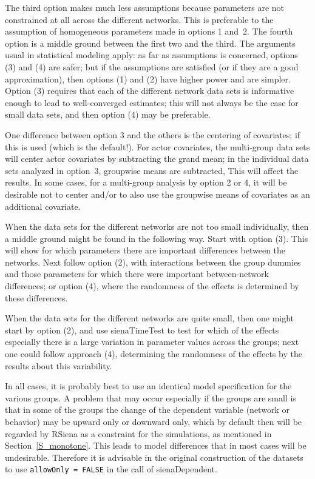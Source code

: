 \documentclass[a4paper,fleqn,11pt]{article}
\newcommand{\+}{\, + \,}
\newcommand{\sfn}[1]{\textsf{#1}}
\newcommand{\RS}{{\sf RSiena }}
\begin{document}
The third option makes much less assumptions because parameters are not
constrained at all across the different networks.
This is preferable to the assumption of homogeneous parameters
made in options 1 and~2.
The fourth option is a middle ground between the first two and the third.
The arguments usual in statistical modeling apply:
as far as assumptions is concerned, options (3) and (4) are safer;
but if the assumptions are satisfied (or if they are a good approximation),
then options (1) and (2) have higher power and are simpler.
Option (3) requires that each of the different network data sets
is informative enough to lead to well-converged estimates;
this will not always be the case for small data sets,
and then option (4) may be preferable.

One difference between option 3 and the others is the centering of covariates;
if this is used (which is the default!).
For actor covariates, the multi-group data sets will center actor covariates
by subtracting the grand mean; in the individual data sets analyzed in option~3,
groupwise means are subtracted, This will affect the results.
In some cases, for a multi-group analysis by option 2 or 4, it will be desirable
not to center and/or to also use the groupwise means of covariates
as an additional covariate.

When the data sets for the different networks are not too small
individually,
then a middle ground might be found in the following way.
Start with option (3). This will show for which parameters there are
important differences between the networks.
Next follow option (2), with interactions between the group dummies
and those parameters for which there were important between-network
differences; or option (4), where the randomness of the effects
is determined by these differences.

When the data sets for the different networks are quite small,
then one might start by option (2), and use \sfn{sienaTimeTest} to test
for which of the effects especially there is a large variation in
parameter values across the groups;
next one could follow approach (4), determining the randomness of the effects
by the results about this variability.

In all cases, it is probably best to use an identical model specification
for the various groups. A problem that may occur especially if the groups
are small is that in some of the groups the change of the dependent variable
(network or behavior) may be upward only or downward only, which by default
then will be regarded by \RS as a constraint for the simulations,
as mentioned in Section~\ref{S_monotone}.
This leads to model differences that in most cases will be undesirable.
Therefore it is advisable in the original construction of the datasets
to use \texttt{allowOnly = FALSE} in the call of \sfn{sienaDependent}.
\end{document}
